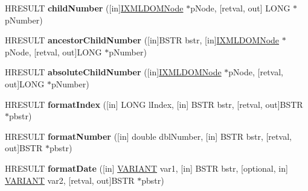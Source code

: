 \begin{DoxyCompactItemize}
H\+R\+E\+S\+U\+LT {\bfseries child\+Number} (\mbox{[}in\mbox{]}\hyperlink{interface_m_s_x_m_l2_1_1_i_x_m_l_d_o_m_node}{I\+X\+M\+L\+D\+O\+M\+Node} $\ast$p\+Node, \mbox{[}retval, out\mbox{]} L\+O\+NG $\ast$p\+Number)
\item 
\mbox{\label{interface_m_s_x_m_l2_1_1_i_x_t_l_runtime_ae6428ef5a67a02bd81bc38db2c9f18ed}} 
H\+R\+E\+S\+U\+LT {\bfseries ancestor\+Child\+Number} (\mbox{[}in\mbox{]}B\+S\+TR bstr, \mbox{[}in\mbox{]}\hyperlink{interface_m_s_x_m_l2_1_1_i_x_m_l_d_o_m_node}{I\+X\+M\+L\+D\+O\+M\+Node} $\ast$p\+Node, \mbox{[}retval, out\mbox{]}L\+O\+NG $\ast$p\+Number)
\item 
\mbox{\label{interface_m_s_x_m_l2_1_1_i_x_t_l_runtime_aa482dbe765de42edcb27b39e6f213d88}} 
H\+R\+E\+S\+U\+LT {\bfseries absolute\+Child\+Number} (\mbox{[}in\mbox{]}\hyperlink{interface_m_s_x_m_l2_1_1_i_x_m_l_d_o_m_node}{I\+X\+M\+L\+D\+O\+M\+Node} $\ast$p\+Node, \mbox{[}retval, out\mbox{]}L\+O\+NG $\ast$p\+Number)
\item 
\mbox{\label{interface_m_s_x_m_l2_1_1_i_x_t_l_runtime_abfe3c838af6b50fa8795438a4c3a5a9d}} 
H\+R\+E\+S\+U\+LT {\bfseries format\+Index} (\mbox{[}in\mbox{]} L\+O\+NG l\+Index, \mbox{[}in\mbox{]} B\+S\+TR bstr, \mbox{[}retval, out\mbox{]}B\+S\+TR $\ast$pbstr)
\item 
\mbox{\label{interface_m_s_x_m_l2_1_1_i_x_t_l_runtime_a0652b99a2d9e73069aa2a1a9035783c9}} 
H\+R\+E\+S\+U\+LT {\bfseries format\+Number} (\mbox{[}in\mbox{]} double dbl\+Number, \mbox{[}in\mbox{]} B\+S\+TR bstr, \mbox{[}retval, out\mbox{]}B\+S\+TR $\ast$pbstr)
\item 
\mbox{\label{interface_m_s_x_m_l2_1_1_i_x_t_l_runtime_a3529a40732e6f5b2377cf7ccd2b88f03}} 
H\+R\+E\+S\+U\+LT {\bfseries format\+Date} (\mbox{[}in\mbox{]} \hyperlink{structtag_v_a_r_i_a_n_t}{V\+A\+R\+I\+A\+NT} var1, \mbox{[}in\mbox{]} B\+S\+TR bstr, \mbox{[}optional, in\mbox{]} \hyperlink{structtag_v_a_r_i_a_n_t}{V\+A\+R\+I\+A\+NT} var2, \mbox{[}retval, out\mbox{]}B\+S\+TR $\ast$pbstr)
\item 
\mbox{\label{interface_m_s_x_m_l2_1_1_i_x_t_l_runtime_ad69be2ddb5c7a2cf6b2946a066ec802a}} 

\end{DoxyCompactItemize}
